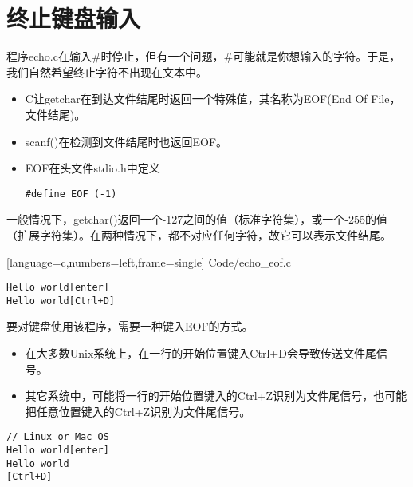 \section{终止键盘输入}

\begin{frame}[fragile]\ft{\secname}
程序{\tf echo.c}在输入{\tf \#}时停止，但有一个问题，{\tf \#}可能就是你想输入的字符。于是，我们自然希望终止字符不出现在文本中。
\end{frame}

\begin{frame}[fragile]
\begin{itemize}
\item 
C让{\tf getchar}在到达文件结尾时返回一个特殊值，其名称为{\tf EOF}(End Of File，文件结尾)。\\[0.1in]
\item
{\tf scanf()}在检测到文件结尾时也返回{\tf EOF}。\\[0.1in]
\item {\tf EOF}在头文件{\tf stdio.h}中定义
\begin{lstlisting}
#define EOF (-1)
\end{lstlisting}
\end{itemize}
\end{frame}

\begin{frame}[fragile]
一般情况下，{\tf getchar()}返回一个{-127}之间的值（标准字符集），或一个{-255}的值（扩展字符集）。在两种情况下，{}都不对应任何字符，故它可以表示文件结尾。
\end{frame}

\begin{frame}[fragile]

[language=c,numbers=left,frame=single]
{Code/echo_eof.c}
\end{frame}

\begin{frame}[fragile]
\begin{lstlisting}
Hello world[enter]
Hello world[Ctrl+D]
\end{lstlisting}
\end{frame}

\begin{frame}[fragile]
要对键盘使用该程序，需要一种键入EOF的方式。\vspace{.1in}

\begin{itemize}
\item 在大多数Unix系统上，在一行的开始位置键入Ctrl+D会导致传送文件尾信号。\\[0.1in]
\item 其它系统中，可能将一行的开始位置键入的Ctrl+Z识别为文件尾信号，也可能把任意位置键入的Ctrl+Z识别为文件尾信号。
\end{itemize}
\end{frame}

\begin{frame}[fragile]
  \begin{lstlisting}[backgroundcolor=\color{blue!20}]
// Linux or Mac OS    
Hello world[enter]
Hello world
[Ctrl+D]
\end{lstlisting}
\end{frame}
